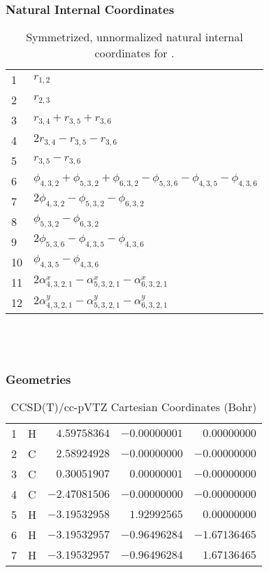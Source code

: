 \documentclass[10pt,oneside]{article}
\begin{document}
\subsubsection*{Natural Internal Coordinates}
\begin{table}[h!]
\centering
\caption{Symmetrized, unnormalized natural internal coordinates for .}
\small
\begin{tabular}{ll}
  1   & $r_{1,2}$ \\
  2   & $r_{2,3}$ \\
  3   & $r_{3,4} + r_{3,5} + r_{3,6}$ \\
  4   & $2r_{3,4} - r_{3,5} - r_{3,6}$ \\
  5   & $r_{3,5} - r_{3,6}$ \\
  6   & $\phi_{4,3,2} + \phi_{5,3,2} + \phi_{6,3,2} - \phi_{5,3,6} - \phi_{4,3,5} - \phi_{4,3,6}$ \\
  7   & $2\phi_{4,3,2} - \phi_{5,3,2} - \phi_{6,3,2}$ \\
  8   & $\phi_{5,3,2} - \phi_{6,3,2}$ \\
  9   & $2\phi_{5,3,6} - \phi_{4,3,5} - \phi_{4,3,6}$ \\
  10  & $\phi_{4,3,5} - \phi_{4,3,6}$ \\
  11  & $2\alpha^x_{4,3,2,1} - \alpha^x_{5,3,2,1} - \alpha^x_{6,3,2,1}$ \\
  12  & $2\alpha^y_{4,3,2,1} - \alpha^y_{5,3,2,1} - \alpha^y_{6,3,2,1}$ \\
\end{tabular}
\end{table}

\clearpage

\subsection{\ \ \ }

\subsubsection*{Geometries}
\begin{table}[h!]
\centering
\caption{CCSD(T)/cc-pVTZ Cartesian Coordinates (Bohr)}
\begin{tabular}{llrrr}
1  & H  & $ 4.59758364$ & $-0.00000001$ & $ 0.00000000$ \\
2  & C  & $ 2.58924928$ & $-0.00000000$ & $-0.00000000$ \\
3  & C  & $ 0.30051907$ & $ 0.00000001$ & $-0.00000000$ \\
4  & C  & $-2.47081506$ & $-0.00000000$ & $-0.00000000$ \\
5  & H  & $-3.19532958$ & $ 1.92992565$ & $ 0.00000000$ \\
6  & H  & $-3.19532957$ & $-0.96496284$ & $-1.67136465$ \\
7  & H  & $-3.19532957$ & $-0.96496284$ & $ 1.67136465$ \\
\end{tabular}
\end{table}
\end{document}
